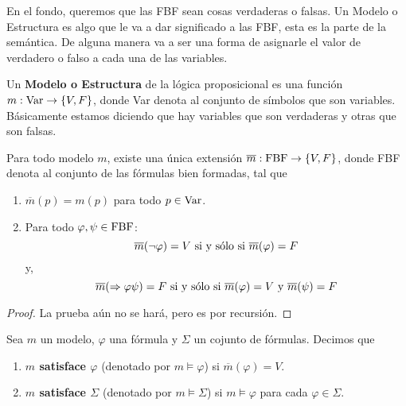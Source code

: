 \documentclass[12pt]{report}
\theoremstyle{largebreak}
\newcommand\cf[3]{\ensuremath{#1:#2\rightarrow#3}}
\begin{document}
    En el fondo, queremos que las FBF sean cosas verdaderas o falsas. Un Modelo o Estructura es algo que le va a dar significado a las FBF, esta es la parte de la semántica. De alguna manera va a ser una forma de asignarle el valor de verdadero o falso a cada una de las variables.

    \begin{mydef}
        Un \textbf{Modelo o Estructura} de la lógica proposicional es una función $\cf{m}{\textup{Var}}{\left\{V,F\right\}}$, donde Var denota al conjunto de símbolos que son variables. Básicamente estamos diciendo que hay variables que son verdaderas y otras que son falsas.
    \end{mydef}

    \begin{theor}
        Para todo modelo $m$, existe una única extensión $\cf{\overline{m}}{\textup{FBF}}{\left\{V,F\right\}}$, donde FBF denota al conjunto de las fórmulas bien formadas, tal que
        \begin{enumerate}
            \item $\overline{m}(p)=m(p)$ para todo $p\in\textup{Var}$.
            \item Para todo $\varphi,\psi\in\textup{FBF}$:
            \begin{equation*}
                \overline{m}(\neg\varphi)=V\textup{ si y sólo si } \overline{m}(\varphi)=F
            \end{equation*}
            y,
            \begin{equation*}
                \overline{m}(\Rightarrow\varphi\psi)=F\textup{ si y sólo si }\overline{m}(\varphi)=V\textup{ y } \overline{m}(\psi)=F
            \end{equation*}
        \end{enumerate}
    \end{theor}

    \begin{proof}
        La prueba aún no se hará, pero es por recursión.
    \end{proof}

    \begin{mydef}
        Sea $m$ un modelo, $\varphi$ una fórmula y $\Sigma$ un cojunto de fórmulas. Decimos que
        \begin{enumerate}
            \item \textbf{$m$ satisface $\varphi$} (denotado por $m\vDash \varphi$) si $\overline{m}(\varphi)=V$.
            \item \textbf{$m$ satisface $\Sigma$} (denotado por $m\vDash \Sigma$) si $m\vDash\varphi$ para cada $\varphi\in\Sigma$.
        \end{enumerate}
    \end{mydef}
\end{document}

